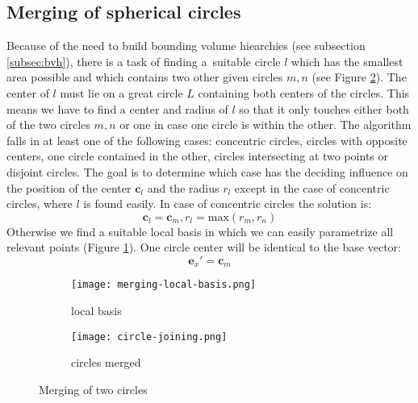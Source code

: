 \subsection{Merging of spherical circles}
Because of the need to build bounding volume hiearchies (see subsection \ref{subsec:bvh}), there is a task of finding a~suitable circle $l$ which has the smallest area possible and which contains two other given circles $m,n$ (see Figure \ref{fig:circles-merged}). The center of $l$ must lie on a great circle $L$ containing both centers of the circles. This means we have to find a center and radius of $l$ so that it only touches either both of the two circles $m,n$ or one in case one circle is within the other. The algorithm falls in at least one of the following cases: concentric circles, circles with opposite centers, one circle contained in the other, circles intersecting at two points or disjoint circles. The goal is to determine which case has the deciding influence on the position of the center $\mathbf{c}_l$ and the radius $r_l$ except in the case of concentric circles, where $l$ is found easily. In case of concentric circles the solution is:
$$\mathbf{c}_l=\mathbf{c}_m, r_l=\mbox{max}(r_m, r_n)$$
Otherwise we find a suitable local basis in which we can easily parametrize all relevant points (Figure \ref{fig:merging-local-basis}). One circle center will be identical to the base vector:
$$\mathbf{e}_x'=\mathbf{c}_m$$
\begin{figure}[ht]
\centering
\begin{subfigure}{7cm}
\texttt{[image: merging-local-basis.png]}
\caption{local basis}
\label{fig:merging-local-basis}
\end{subfigure}
\hspace*{1cm}
\begin{subfigure}{7cm}
\texttt{[image: circle-joining.png]}
\caption{circles merged}
\label{fig:circles-merged}
\end{subfigure}
\caption{Merging of two circles}
\label{fig:merging-circles}
\end{figure}

